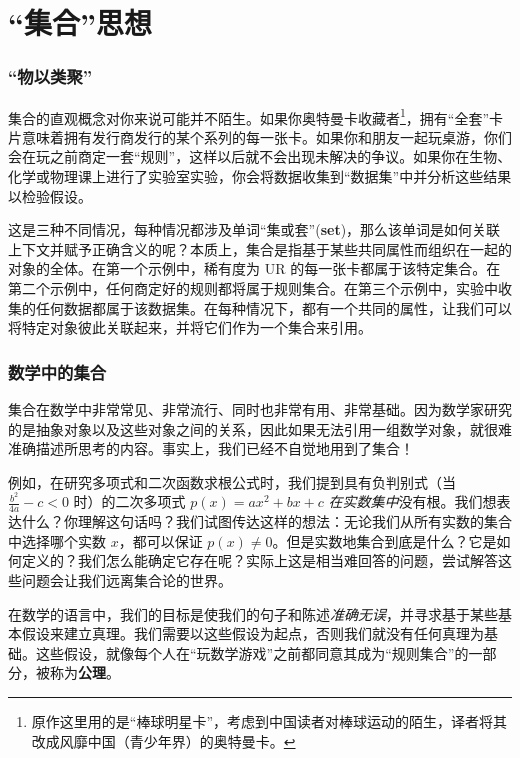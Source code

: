 \section{``集合''思想}

\subsubsection*{``物以类聚''}

集合的直观概念对你来说可能并不陌生。如果你奥特曼卡收藏者\footnote{原作这里用的是``棒球明星卡''，考虑到中国读者对棒球运动的陌生，译者将其改成风靡中国（青少年界）的奥特曼卡。}，拥有``全套''卡片意味着拥有发行商发行的某个系列的每一张卡。如果你和朋友一起玩桌游，你们会在玩之前商定一套``规则''，这样以后就不会出现未解决的争议。如果你在生物、化学或物理课上进行了实验室实验，你会将数据收集到``数据集''中并分析这些结果以检验假设。

这是三种不同情况，每种情况都涉及单词``集或套''(\textbf{set})，那么该单词是如何关联上下文并赋予正确含义的呢？本质上，集合是指基于某些共同属性而组织在一起的对象的全体。在第一个示例中，稀有度为 UR 的每一张卡都属于该特定集合。在第二个示例中，任何商定好的规则都将属于规则集合。在第三个示例中，实验中收集的任何数据都属于该数据集。在每种情况下，都有一个共同的属性，让我们可以将特定对象彼此关联起来，并将它们作为一个集合来引用。

\subsubsection*{数学中的集合}

集合在数学中非常常见、非常流行、同时也非常有用、非常基础。因为数学家研究的是抽象对象以及这些对象之间的关系，因此如果无法引用一组数学对象，就很难准确描述所思考的内容。事实上，我们已经不自觉地用到了集合！

例如，在研究多项式和二次函数求根公式时，我们提到具有负判别式（当 $\frac{b^2}{4a} - c < 0$ 时）的二次多项式 $p(x) = ax^2 + bx + c$ \textit{在实数集中}没有根。我们想表达什么？你理解这句话吗？我们试图传达这样的想法：无论我们从所有实数的集合中选择哪个实数 $x$，都可以保证 $p(x) \ne 0$。但是实数地集合到底是什么？它是如何定义的？我们怎么能确定它存在呢？实际上这是相当难回答的问题，尝试解答这些问题会让我们远离集合论的世界。

在数学的语言中，我们的目标是使我们的句子和陈述\textit{准确无误}，并寻求基于某些基本假设来建立真理。我们需要以这些假设为起点，否则我们就没有任何真理为基础。这些假设，就像每个人在``玩数学游戏''之前都同意其成为``规则集合''的一部分，被称为\textbf{公理}。

